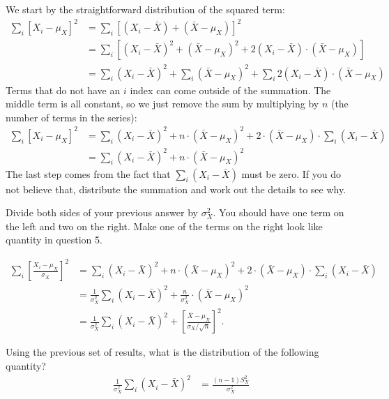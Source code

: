 
We start by the straightforward
distribution of the squared term:
\begin{align*}
\sum_i \left[ X_i - \mu_X \right]^2 &= \sum_i \left[ (X_i - \bar{X}) + (\bar{X} - \mu_X) \right]^2 \\
&= \sum_i \left[ (X_i - \bar{X})^2 + (\bar{X} - \mu_X)^2 + 2 (X_i - \bar{X}) \cdot (\bar{X} - \mu_X) \right] \\
&= \sum_i (X_i - \bar{X})^2 + \sum_i (\bar{X} - \mu_X)^2 + \sum_i 2 (X_i - \bar{X}) \cdot (\bar{X} - \mu_X)
\end{align*}
Terms that do not have an $i$ index can come outside of the summation. The middle
term is all constant, so we just remove the sum by multiplying by $n$ (the number
of terms in the series):
\begin{align*}
\sum_i \left[ X_i - \mu_X \right]^2 
&= \sum_i (X_i - \bar{X})^2 + n \cdot (\bar{X} - \mu_X)^2 + 2 \cdot (\bar{X} - \mu_X) \cdot \sum_i  (X_i - \bar{X}) \\
&= \sum_i (X_i - \bar{X})^2 + n \cdot (\bar{X} - \mu_X)^2
\end{align*}
The last step comes from the fact that $\sum_i (X_i - \bar{X})$ must be zero. If
you do not believe that, distribute the summation and work out the details to see
why. 


Divide both sides of your previous answer by $\sigma_X^2$. You
should have one term on the left and two on the right. Make one of the terms
on the right look like quantity in question 5.


\begin{align*}
\sum_i \left[ \frac{X_i - \mu_X}{\sigma_X} \right]^2 
&= \sum_i (X_i - \bar{X})^2 + n \cdot (\bar{X} - \mu_X)^2 + 2 \cdot (\bar{X} - \mu_X) \cdot \sum_i  (X_i - \bar{X}) \\
&= \frac{1}{\sigma_X^2} \sum_i (X_i - \bar{X})^2 + \frac{n}{\sigma_X^2} \cdot (\bar{X} - \mu_X)^2 \\
&= \frac{1}{\sigma_X^2} \sum_i (X_i - \bar{X})^2 + \left[\frac{\bar{X} - \mu_X}{\sigma_X / \sqrt{n}} \right]^2.
\end{align*}


Using the previous set of results, what is the distribution of
the following quantity?
\begin{align*}
\frac{1}{\sigma_X^2} \sum_i (X_i - \bar{X})^2 &= \frac{(n-1) S_X^2}{\sigma_X^2}
\end{align*}

